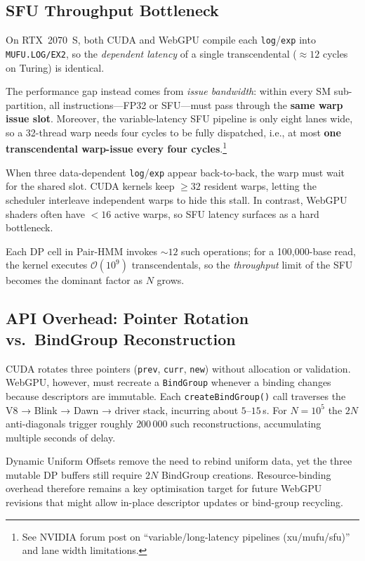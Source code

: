 \documentclass[PhD]{PHlab-thesis}
\begin{document}
\subsection{SFU Throughput Bottleneck}

On RTX~2070~S, both CUDA and WebGPU compile each
\texttt{log}/\texttt{exp} into \texttt{MUFU.LOG/EX2}, so the
\emph{dependent latency} of a single transcendental
($\approx 12$ cycles on Turing) is identical.

The performance gap instead comes from \emph{issue bandwidth}:
within every SM sub-partition, all instructions—FP32 or SFU—must pass
through the \textbf{same warp issue slot}.
Moreover, the variable-latency SFU pipeline is only eight lanes wide,
so a 32-thread warp needs four cycles to be fully dispatched,
i.e., at most \textbf{one transcendental warp-issue every four cycles}.\footnote{See NVIDIA forum post on “variable/long-latency pipelines (xu/mufu/sfu)” and lane width limitations.}

When three data-dependent \texttt{log}/\texttt{exp} appear back-to-back,
the warp must wait for the shared slot. CUDA kernels keep
$\geq 32$ resident warps, letting the scheduler interleave
independent warps to hide this stall.
In contrast, WebGPU shaders often have $<16$ active warps,
so SFU latency surfaces as a hard bottleneck.

Each DP cell in Pair-HMM invokes $\sim 12$ such operations;
for a 100{,}000-base read, the kernel executes
$\mathcal{O}(10^{9})$ transcendentals, so the
\emph{throughput} limit of the SFU
becomes the dominant factor as $N$ grows.



\subsection{API Overhead: Pointer Rotation vs.\ BindGroup Reconstruction}
CUDA rotates three pointers (\texttt{prev}, \texttt{curr}, \texttt{new}) without allocation or validation.  
WebGPU, however, must recreate a \texttt{BindGroup} whenever a binding changes because descriptors are immutable. Each \texttt{createBindGroup()} call traverses the V8 → Blink → Dawn → driver stack, incurring about $5$–$15$\,\textmu s. For $N=10^{5}$ the $2N$ anti-diagonals trigger roughly $200\,000$ such reconstructions, accumulating multiple seconds of delay.

Dynamic Uniform Offsets remove the need to rebind uniform data, yet the three mutable DP buffers still require $2N$ BindGroup creations. Resource-binding overhead therefore remains a key optimisation target for future WebGPU revisions that might allow in-place descriptor updates or bind-group recycling.
\end{document}
